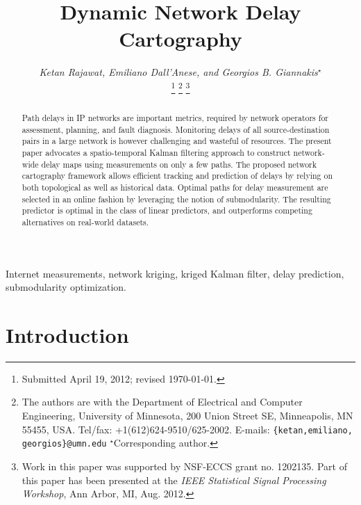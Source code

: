 \documentclass[draftcls,onecolumn,12pt]{IEEEtran}
\theoremstyle{plain}\newtheorem{thm}{Theorem}
\theoremstyle{definition}
\theoremstyle{remark}
\begin{document}
\title{Dynamic Network Delay Cartography}

\author{\emph{Ketan Rajawat, Emiliano Dall'Anese, and Georgios B. Giannakis}$^\star$ 


\thanks{Submitted April 19, 2012; revised \today.}
\thanks{\protect\rule{0pt}{0.5cm}The authors are with the Department of Electrical and Computer Engineering, University of Minnesota, 200 Union Street SE, Minneapolis, MN 55455, USA. Tel/fax: +1(612)624-9510/625-2002. E-mails: {\tt \{ketan,emiliano, georgios\}@umn.edu}
$^\star$Corresponding author.
}
\thanks{\protect\rule{0pt}{0.5cm}Work in this paper was supported by NSF-ECCS grant no. 1202135. Part of this paper has been presented at the \emph{IEEE Statistical Signal Processing Workshop}, Ann Arbor, MI, Aug. 2012.}
}




\maketitle




\begin{abstract}
Path delays in IP networks are important metrics, required by network operators for assessment, planning, and fault diagnosis.
Monitoring delays of all source-destination pairs in a large network is however challenging and wasteful of resources.
The present paper advocates a spatio-temporal Kalman filtering approach to construct network-wide delay maps using measurements on only a few paths. 
The proposed network cartography framework allows efficient tracking and prediction of delays by relying on both topological as well as historical data.
Optimal paths for delay measurement are selected in an online fashion by leveraging the notion of submodularity.
The resulting predictor is optimal in the class of linear predictors, and outperforms competing alternatives on real-world datasets.
\end{abstract}


\begin{IEEEkeywords}
Internet measurements, network kriging, kriged Kalman filter, delay prediction, submodularity optimization.
\end{IEEEkeywords}

\newpage

\section{Introduction}\label{intro}
\end{document}
